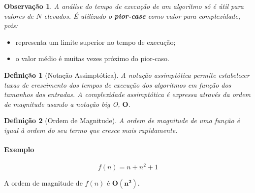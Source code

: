 \documentclass[a4paper, 12pt]{article}
\newtheorem{definition}{Definição}[section]
\newtheorem{remark}{Observação}
\begin{document}
\begin{remark}
    A análise do tempo de execução de um algoritmo só é útil para valores de $N$ elevados. É utilizado o \textbf{pior-case} como valor para complexidade, pois:\end{remark}

    \begin{itemize}
        \item representa um limite superior no tempo de execução;
        \item o valor médio é muitas vezes próximo do pior-caso.
    \end{itemize}

\begin{definition}[Notação Assimptótica]
    A notação assimptótica permite estabelecer taxas de crescimento dos tempos de execução dos algoritmos em função dos tamanhos das entradas. A complexidade assimptótica é expressa através da ordem de magnitude usando a notação \emph{big O}, $\mathbf{O}$.
\end{definition}

\begin{definition}[Ordem de Magnitude]
    A ordem de magnitude de uma função é igual à ordem do seu termo que cresce mais rapidamente.
\end{definition}

\paragraph{Exemplo}
    $$
        f(n)=n+n^2+1
    $$

    A ordem de magnitude de $f(n)$ é $\mathbf{O(n^2)}$.
\end{document}
